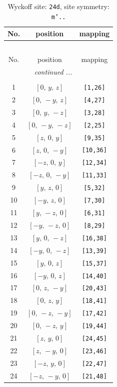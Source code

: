 \documentclass[fleqn,8pt]{jsarticle}
\begin{document}
\begin{longtable}{ccc}
\caption{Wyckoff site: {\tt 24d}, site symmetry: {\tt m'..}}
 \\
 \hline \hline
No. & position & mapping \\ \hline \endfirsthead

\multicolumn{2}{l}{\tablename\ \thetable{}} \\
 \hline \hline
No. & position & mapping \\ \hline \endhead

 \hline \hline
\multicolumn{2}{r}{\footnotesize\it continued ...} \\ \endfoot

 \hline \hline
\multicolumn{2}{r}{} \\ \endlastfoot

1 & $\left[ 0,\, y,\, z \right]$ & {\tt [1,26]} \\ \hline
2 & $\left[ 0,\, - y,\, z \right]$ & {\tt [4,27]} \\ \hline
3 & $\left[ 0,\, y,\, - z \right]$ & {\tt [3,28]} \\ \hline
4 & $\left[ 0,\, - y,\, - z \right]$ & {\tt [2,25]} \\ \hline
5 & $\left[ z,\, 0,\, y \right]$ & {\tt [9,35]} \\ \hline
6 & $\left[ z,\, 0,\, - y \right]$ & {\tt [10,36]} \\ \hline
7 & $\left[ - z,\, 0,\, y \right]$ & {\tt [12,34]} \\ \hline
8 & $\left[ - z,\, 0,\, - y \right]$ & {\tt [11,33]} \\ \hline
9 & $\left[ y,\, z,\, 0 \right]$ & {\tt [5,32]} \\ \hline
10 & $\left[ - y,\, z,\, 0 \right]$ & {\tt [7,30]} \\ \hline
11 & $\left[ y,\, - z,\, 0 \right]$ & {\tt [6,31]} \\ \hline
12 & $\left[ - y,\, - z,\, 0 \right]$ & {\tt [8,29]} \\ \hline
13 & $\left[ y,\, 0,\, - z \right]$ & {\tt [16,38]} \\ \hline
14 & $\left[ - y,\, 0,\, - z \right]$ & {\tt [13,39]} \\ \hline
15 & $\left[ y,\, 0,\, z \right]$ & {\tt [15,37]} \\ \hline
16 & $\left[ - y,\, 0,\, z \right]$ & {\tt [14,40]} \\ \hline
17 & $\left[ 0,\, z,\, - y \right]$ & {\tt [20,43]} \\ \hline
18 & $\left[ 0,\, z,\, y \right]$ & {\tt [18,41]} \\ \hline
19 & $\left[ 0,\, - z,\, - y \right]$ & {\tt [17,42]} \\ \hline
20 & $\left[ 0,\, - z,\, y \right]$ & {\tt [19,44]} \\ \hline
21 & $\left[ z,\, y,\, 0 \right]$ & {\tt [24,45]} \\ \hline
22 & $\left[ z,\, - y,\, 0 \right]$ & {\tt [23,46]} \\ \hline
23 & $\left[ - z,\, y,\, 0 \right]$ & {\tt [22,47]} \\ \hline
24 & $\left[ - z,\, - y,\, 0 \right]$ & {\tt [21,48]} \\
\end{longtable}
\end{document}
